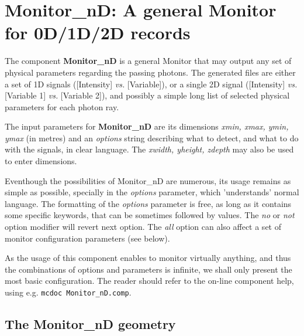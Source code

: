 \section{Monitor\_nD: A general Monitor for 0D/1D/2D records}
\label{s:monitornd}

The component \textbf{Monitor\_nD} is a general Monitor that may output any
set of physical parameters regarding the passing photons. The
generated files are either a set of 1D signals ([Intensity] \textit{vs.}
[Variable]), or a single 2D signal ([Intensity] \textit{vs.} [Variable 1]
\textit{vs.} [Variable 2]), and possibly a simple long list of selected
physical parameters for each photon ray.

The input parameters for \textbf{Monitor\_nD} are its dimensions \textit{xmin, xmax, ymin, ymax} (in metres) and an \textit{
  options} string describing what to detect, and what to do with the
  signals, in clear language. The \textit{xwidth, yheight, zdepth} may also be used to enter dimensions.

  Eventhough the possibilities of Monitor\_nD are numerous, its usage remains as simple as possible, specially in the \textit{options} parameter, which 'understands' normal language.
The formatting of the \textit{options}
parameter is free, as long as it contains some specific keywords, that
can be sometimes followed by values. The \textit{no} or \textit{not} option
modifier will revert next option. The \textit{all} option can also affect a
set of monitor configuration parameters (see below).

As the usage of this component enables to monitor virtually anything, and thus the combinations of options and parameters is infinite, we shall only present the most basic configuration. The reader should refer to the on-line component help, using e.g. \verb+mcdoc Monitor_nD.comp+.

\subsection{The Monitor\_nD geometry}

